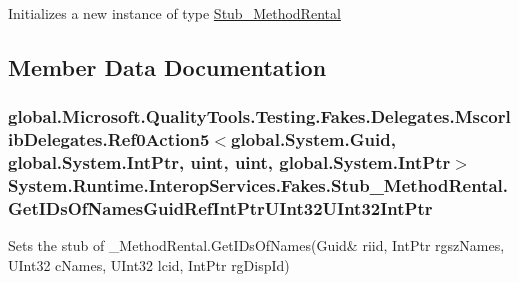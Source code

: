 Initializes a new instance of type \hyperlink{class_system_1_1_runtime_1_1_interop_services_1_1_fakes_1_1_stub___method_rental}{Stub\-\_\-\-Method\-Rental}



\subsection{Member Data Documentation}
\hypertarget{class_system_1_1_runtime_1_1_interop_services_1_1_fakes_1_1_stub___method_rental_a1ea514473499be4480bdf4eb1515999d}{
\subsubsection[{Get\-I\-Ds\-Of\-Names\-Guid\-Ref\-Int\-Ptr\-U\-Int32\-U\-Int32\-Int\-Ptr}]{\setlength{\rightskip}{0pt plus 5cm}global.\-Microsoft.\-Quality\-Tools.\-Testing.\-Fakes.\-Delegates.\-Mscorlib\-Delegates.\-Ref0\-Action5$<$global.\-System.\-Guid, global.\-System.\-Int\-Ptr, uint, uint, global.\-System.\-Int\-Ptr$>$ System.\-Runtime.\-Interop\-Services.\-Fakes.\-Stub\-\_\-\-Method\-Rental.\-Get\-I\-Ds\-Of\-Names\-Guid\-Ref\-Int\-Ptr\-U\-Int32\-U\-Int32\-Int\-Ptr}}\label{class_system_1_1_runtime_1_1_interop_services_1_1_fakes_1_1_stub___method_rental_a1ea514473499be4480bdf4eb1515999d}


Sets the stub of \-\_\-\-Method\-Rental.\-Get\-I\-Ds\-Of\-Names(Guid\& riid, Int\-Ptr rgsz\-Names, U\-Int32 c\-Names, U\-Int32 lcid, Int\-Ptr rg\-Disp\-Id)

